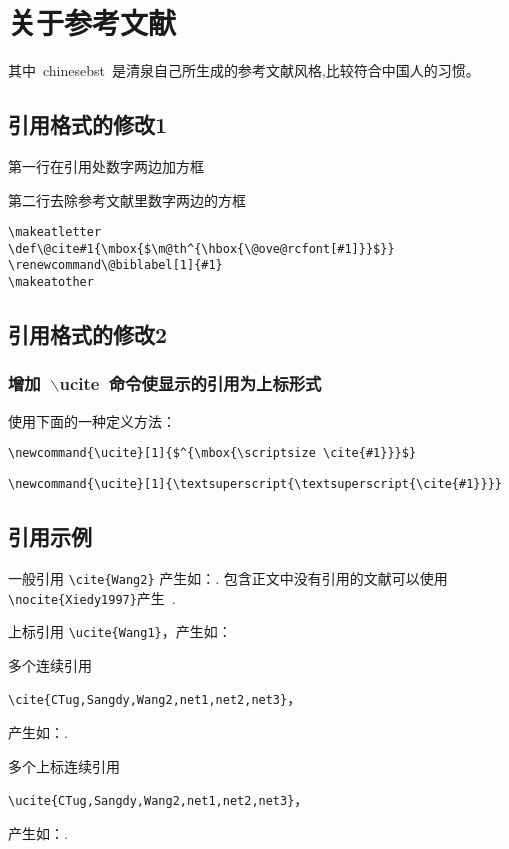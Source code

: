 \chapter{关于参考文献}

其中~chinesebst~是清泉自己所生成的参考文献风格,比较符合中国人的习惯。
\section{引用格式的修改1}

第一行在引用处数字两边加方框

第二行去除参考文献里数字两边的方框

\begin{verbatim}
\makeatletter
\def\@cite#1{\mbox{$\m@th^{\hbox{\@ove@rcfont[#1]}}$}}
\renewcommand\@biblabel[1]{#1}
\makeatother
\end{verbatim}
\section{引用格式的修改2}
\subsection*{增加~$\backslash$ucite~命令使显示的引用为上标形式}
使用下面的一种定义方法：
\begin{verbatim}
\newcommand{\ucite}[1]{$^{\mbox{\scriptsize \cite{#1}}}$}
\end{verbatim}
\begin{verbatim}
\newcommand{\ucite}[1]{\textsuperscript{\textsuperscript{\cite{#1}}}}
\end{verbatim}
\section{引用示例}
一般引用 \verb"\cite{Wang2}"
产生如：\cite{Wang2}. 包含正文中没有引用的文献可以使用\verb/\nocite{Xiedy1997}/产生~\nocite{Xiedy1997}.

上标引用 \verb"\ucite{Wang1}"，产生如：

多个连续引用

\verb"\cite{CTug,Sangdy,Wang2,net1,net2,net3}"，

产生如：\cite{CTug,Sangdy,Wang2,net1,net2,net3}.


多个上标连续引用

\verb"\ucite{CTug,Sangdy,Wang2,net1,net2,net3}"，

产生如：.
